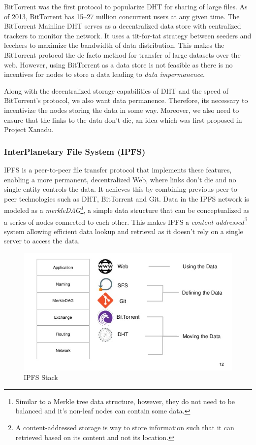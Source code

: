 		BitTorrent\cite{cohen2008bittorrent} was the first protocol to popularize DHT for sharing of large files. As of 2013, BitTorrent has 15–27 million concurrent users at any given time\cite{wang2013measuring}. The BitTorrent Mainline DHT serves as a decentralized data store with centralized trackers to monitor the network. It uses a tit-for-tat strategy between seeders and leechers to maximize the bandwidth of data distribution. This makes the BitTorrent protocol the de facto method for transfer of large datasets over the web. However, using BitTorrent as a data store is not feasible as there is no incentives for nodes to store a data leading to \textit{data impermanence}.
		
		Along with the decentralized storage capabilities of DHT and the speed of BitTorrent's protocol, we also want data permanence. Therefore, its necessary to incentivize the nodes storing the data in some way. Moreover, we also need to ensure that the links to the data don't die, an idea which was first proposed in Project Xanadu\cite{rayward1994visions}.
		
		\subsubsection{InterPlanetary File System (IPFS)} 
			IPFS\cite{benet2014ipfs} is a peer-to-peer file transfer protocol that implements these features, enabling a more permanent, decentralized Web, where links don't die and no single entity controls the data. It achieves this by combining previous peer-to-peer technologies such as DHT, BitTorrent and Git\cite{loeliger2012version}. Data in the IPFS network is modeled as a \textit{merkleDAG\footnote{Similar to a Merkle tree data structure, however, they do not need to be balanced and it's non-leaf nodes can contain some data.}}, a simple data structure that can be conceptualized as a series of nodes connected to each other\cite{raval2016decentralized}. This makes IPFS a \textit{content-addressed\footnote{A content-addressed storage is way to store information such that it can retrieved based on its content and not its location.}} system allowing efficient data lookup and retrieval as it doesn't rely on a single server to access the data.
		
			\begin{figure}[h]
				\includegraphics[width=\linewidth]{figures/ipfs-stack}
				\caption{\label{fig:ipfs-stack} IPFS Stack}
			\end{figure}
		
